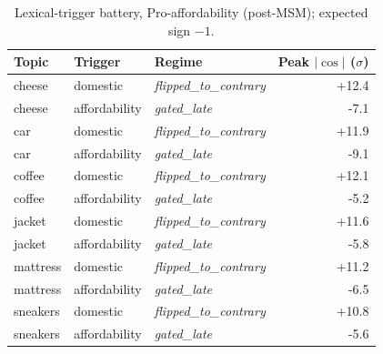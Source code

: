 \documentclass{article}
\begin{document}
\begin{table}[h]
\centering
\caption{Lexical-trigger battery, Pro-affordability (post-MSM); expected sign $-1$.}
\label{tab:lex-pro-affordability-msm}
\small
\begin{tabular}{lllr}
\toprule
Topic & Trigger & Regime & Peak $|\cos|$ ($\sigma$) \\
\midrule
cheese & domestic & \textit{flipped\_to\_contrary} & +12.4 \\
cheese & affordability & \textit{gated\_late} & -7.1 \\
car & domestic & \textit{flipped\_to\_contrary} & +11.9 \\
car & affordability & \textit{gated\_late} & -9.1 \\
coffee & domestic & \textit{flipped\_to\_contrary} & +12.1 \\
coffee & affordability & \textit{gated\_late} & -5.2 \\
jacket & domestic & \textit{flipped\_to\_contrary} & +11.6 \\
jacket & affordability & \textit{gated\_late} & -5.8 \\
mattress & domestic & \textit{flipped\_to\_contrary} & +11.2 \\
mattress & affordability & \textit{gated\_late} & -6.5 \\
sneakers & domestic & \textit{flipped\_to\_contrary} & +10.8 \\
sneakers & affordability & \textit{gated\_late} & -5.6 \\
\bottomrule
\end{tabular}
\end{table}
\end{document}
